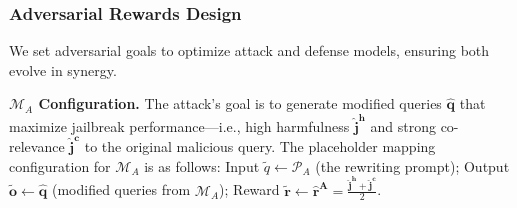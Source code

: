 \documentclass[11pt]{article}
\begin{document}

\subsubsection{Adversarial Rewards Design} 
We set adversarial goals to optimize attack and defense models, ensuring both evolve in synergy.



\textbf{$\mathcal{M}_{A}$ Configuration.} The attack’s goal is to generate  modified queries $\mathbf{\hat{q}}$ that maximize jailbreak performance—i.e., high harmfulness $\mathbf{\hat{j}^{h}}$ and strong co-relevance $\mathbf{\hat{j}^{c}}$ to the original malicious query. The placeholder mapping configuration for $\mathcal{M}_{A}$ is as follows: Input $\widetilde{q} \leftarrow \mathcal{P}_{A}$ (the rewriting prompt); Output $\mathbf{\widetilde{o}} \leftarrow \mathbf{\hat{q}}$ (modified queries from $\mathcal{M}_{A}$); Reward  $\mathbf{\widetilde{r}} \leftarrow \mathbf{\hat{r}^{A}} = \frac{\mathbf{\hat{j}^{h}} + \mathbf{\hat{j}^{c}}}{2}$.
 


 

\end{document}
